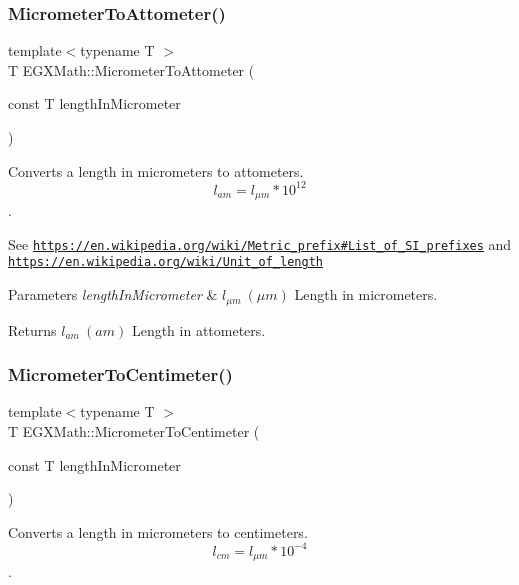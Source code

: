 \subsubsection{\texorpdfstring{Micrometer\+To\+Attometer()}{MicrometerToAttometer()}}
{\footnotesize\ttfamily template$<$typename T $>$ \\
T E\+G\+X\+Math\+::\+Micrometer\+To\+Attometer (\begin{DoxyParamCaption}\item[{const T}]{length\+In\+Micrometer }\end{DoxyParamCaption})}



Converts a length in micrometers to attometers. \[ l_{am}=l_{\mu m} * 10^{12} \]. 

See \href{https://en.wikipedia.org/wiki/Metric_prefix#List_of_SI_prefixes}{\tt https\+://en.\+wikipedia.\+org/wiki/\+Metric\+\_\+prefix\#\+List\+\_\+of\+\_\+\+S\+I\+\_\+prefixes} and \href{https://en.wikipedia.org/wiki/Unit_of_length}{\tt https\+://en.\+wikipedia.\+org/wiki/\+Unit\+\_\+of\+\_\+length} 
\begin{DoxyParams}{Parameters}
{\em length\+In\+Micrometer} & $ l_{\mu m}\ (\mu m)$ Length in micrometers. \\
\hline
\end{DoxyParams}
\begin{DoxyReturn}{Returns}
$ l_{am}\ (am)$ Length in attometers. 
\end{DoxyReturn}
\mbox{\label{group___e_g_x_math-_conversions-_length_conversions-_micrometer-_s_i_ga43ca5990e1bddd832e2fe0cf8fff879f}} 
\subsubsection{\texorpdfstring{Micrometer\+To\+Centimeter()}{MicrometerToCentimeter()}}
{\footnotesize\ttfamily template$<$typename T $>$ \\
T E\+G\+X\+Math\+::\+Micrometer\+To\+Centimeter (\begin{DoxyParamCaption}\item[{const T}]{length\+In\+Micrometer }\end{DoxyParamCaption})}



Converts a length in micrometers to centimeters. \[ l_{cm}=l_{\mu m} * 10^{-4} \]. 

